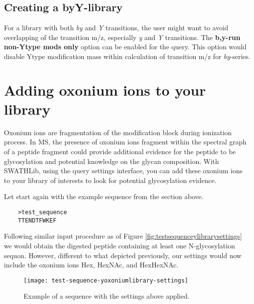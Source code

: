 \documentclass[../manual.tex]{subfiles}
\begin{document}
\subsection{Creating a byY-library}
For a library with both \emph{by} and \emph{Y} transitions, the user might want to avoid overlapping of the transition m/z, especially \emph{y} and \emph{Y} transitions. The \textbf{b,y-run non-Ytype mods only} option can be enabled for the query. This option would disable Ytype modification mass within calculation of transition m/z for \emph{by}-series.

\section{Adding oxonium ions to your library}
Oxonium ions are fragmentation of the modification block during ionization process. In MS, the presence of oxonium ions fragment within the spectral graph of a peptide fragment could provide additional evidence for the peptide to be glycosylation and potential knowledge on the glycan composition. With SWATHLib, using the query settings interface, you can add these oxonium ions to your library of interests to look for potential glycosylation evidence.\par

Let start again with the example sequence from the section above.\par
\begin{verbatim}
	>test_sequence
	TTENDTFWKEF
\end{verbatim}

Following similar input procedure as of Figure \ref{fig:testsequenceylibrarysettings} we would obtain the digested peptide containing at least one N-glycosylation sequon. However, different to what depicted previously, our settings would now include the oxonium ions Hex, HexNAc, and HexHexNAc.\par

\begin{figure}[H]
	\centering
	\begin{framed}
        \centering
        \begin{adjustbox}{width=1\textwidth}
			\texttt{[image: test-sequence-yoxoniumlibrary-settings]}
		\end{adjustbox}
		\caption{Example of a sequence with the settings above applied.}\label{fig:testsequenceyoxoniumlibrarysettings}
	\end{framed}
\end{figure}
\end{document}
